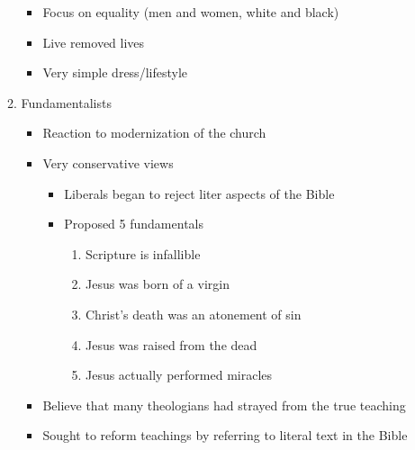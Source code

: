 \documentclass[8pt]{article}
\begin{document}
\begin{enumerate}
\begin{enumerate}
\begin{itemize}
            \item Focus on equality (men and women, white and black)
            \item Live removed lives
            \item Very simple dress/lifestyle
        \end{itemize}
        \item Fundamentalists
        \begin{itemize}
            \item Reaction to modernization of the church
            \item Very conservative views
            \begin{itemize}
                \item Liberals began to reject liter aspects of the Bible
                \item Proposed 5 fundamentals
                \begin{enumerate}
                    \item Scripture is infallible
                    \item Jesus was born of a virgin
                    \item Christ's death was an atonement of sin
                    \item Jesus was raised from the dead
                    \item Jesus actually performed miracles
                \end{enumerate}
            \end{itemize}
            \item Believe that many theologians had strayed from the true teaching
            \item Sought to reform teachings by referring to literal text in the Bible
        \end{itemize}
    \end{enumerate}


\end{enumerate}
\end{document}
